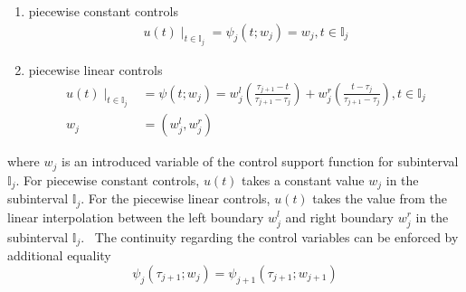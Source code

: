 \documentclass  [
  paper    = a4,
  BCOR     = 10mm,
  twoside,
  fontsize = 12pt,
  fleqn,
  toc      = bibnumbered,
  toc      = listofnumbered,
  numbers  = noendperiod,
  headings = normal,
  listof   = leveldown,
  version  = 3.03
]                                       {scrreprt}
\newcommand{\<}{\langle}
\renewcommand{\>}{\rangle}
\begin{document}
\begin{enumerate}
	\item piecewise constant controls
	\begin{align}
	 u(t) \mid_{t \in \mathbb{I}_j} = \psi_j(t;w_j)= w_j, t \in \mathbb{I}_j
	 \end{align}
	\item piecewise linear controls
		\begin{align}
		u(t) \mid_{t \in \mathbb{I}_j} &= \psi(t;w_j)= w_j^l (\frac{\tau_{j+1} -t }{\tau_{j+1} - \tau_j}) + w_j^r (\frac{t- \tau_j}{\tau_{j+1} - \tau_j}) , t \in \mathbb{I}_j \\
		w_j &= (w_j^l, w_j^r)
	\end{align} 
\end{enumerate}

where $w_j$ is an introduced variable of the control support function for subinterval $ \mathbb{I}_j$. For piecewise constant controls, $u(t)$ takes a constant value $w_j$ in the subinterval $\mathbb{I}_j$. For the piecewise linear controls, $u(t)$ takes the value from the linear interpolation between the left boundary $w_j^l$ and right boundary $w_j^r$ in the subinterval $\mathbb{I}_j$.  The continuity regarding the control variables can be enforced by additional equality 
\begin{equation}
	\psi_j(\tau_{j+1};w_j) =  \psi_{j+1}(\tau_{j+1};w_{j+1})
\end{equation}
\end{document}
